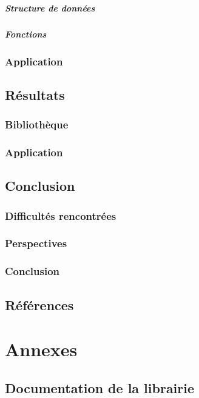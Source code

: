 \documentclass{report}
\begin{document}
				\subsubsection{Structure de données}
				\subsubsection{Fonctions}
			\subsection{}
		\section{Application}
	
	\chapter{Résultats}
		\section{Bibliothèque}
		\section{Application}
	
	\chapter{Conclusion}
		\section{Difficultés rencontrées}
		\section{Perspectives}
		\section{Conclusion}
	
	\chapter{Références}
	
	\part{Annexes}
	\appendix
		\chapter{Documentation de la librairie}	
\end{document}

